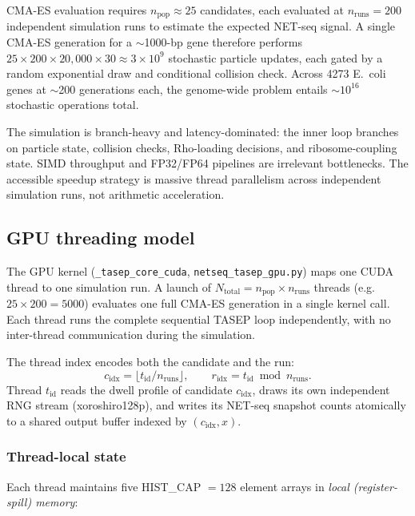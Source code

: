 \documentclass[11pt]{article}
\begin{document}
CMA-ES evaluation requires $n_{\text{pop}} \approx 25$ candidates, each
evaluated at $n_{\text{runs}} = 200$ independent simulation runs to estimate
the expected NET-seq signal. A single CMA-ES generation for a $\sim$1000-bp
gene therefore performs $25 \times 200 \times 20{,}000 \times 30 \approx 3
\times 10^9$ stochastic particle updates, each gated by a random
exponential draw and conditional collision check. Across 4273 E.\ coli genes
at $\sim$200 generations each, the genome-wide problem entails $\sim
10^{16}$ stochastic operations total.

The simulation is branch-heavy and latency-dominated: the inner loop
branches on particle state, collision checks, Rho-loading decisions, and
ribosome-coupling state. SIMD throughput and FP32/FP64 pipelines are
irrelevant bottlenecks. The accessible speedup strategy is massive thread
parallelism across independent simulation runs, not arithmetic acceleration.

\subsection{GPU threading model}

The GPU kernel (\texttt{\_tasep\_core\_cuda}, \texttt{netseq\_tasep\_gpu.py})
maps one CUDA thread to one simulation run. A launch of
$N_{\text{total}} = n_{\text{pop}} \times n_{\text{runs}}$ threads
(e.g.\ $25 \times 200 = 5000$) evaluates one full CMA-ES generation in a
single kernel call. Each thread runs the complete sequential TASEP loop
independently, with no inter-thread communication during the simulation.

The thread index encodes both the candidate and the run:
\begin{equation}
  c_{\text{idx}} = \lfloor t_{\text{id}} / n_{\text{runs}} \rfloor,
  \qquad
  r_{\text{idx}} = t_{\text{id}} \bmod n_{\text{runs}}.
\end{equation}
Thread $t_{\text{id}}$ reads the dwell profile of candidate $c_{\text{idx}}$,
draws its own independent RNG stream (xoroshiro128p), and writes its NET-seq
snapshot counts atomically to a shared output buffer indexed by
$(c_{\text{idx}}, x)$.

\subsubsection*{Thread-local state}

Each thread maintains five HIST\_CAP $= 128$ element arrays in
\emph{local (register-spill) memory}:
\end{document}
